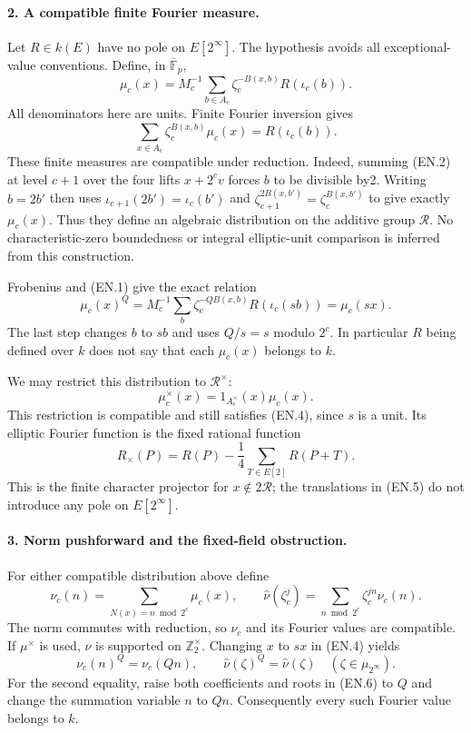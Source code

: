 \paragraph{2. A compatible finite Fourier measure.}
Let $R\in k(E)$ have no pole on $E[2^\infty]$.  The hypothesis avoids all
exceptional-value conventions.  Define, in $\overline{\mathbb F}_p$,
\[
 \mu_c(x)=M_c^{-1}\sum_{b\in A_c}
       \zeta_c^{-B(x,b)}R(\iota_c(b)).                         \tag{EN.2}
\]
All denominators here are units.  Finite Fourier inversion gives
\[
 \sum_{x\in A_c}\zeta_c^{B(x,b)}\mu_c(x)=R(\iota_c(b)).       \tag{EN.3}
\]
These finite measures are compatible under reduction.  Indeed, summing
(EN.2) at level $c+1$ over the four lifts $x+2^c v$ forces $b$ to be
divisible by2.  Writing $b=2b'$ then uses
$\iota_{c+1}(2b')=\iota_c(b')$ and
$\zeta_{c+1}^{2B(x,b')}=\zeta_c^{B(x,b')}$ to give exactly $\mu_c(x)$.
Thus they define an algebraic distribution on the additive group
$\mathcal R$.  No characteristic-zero boundedness or integral
elliptic-unit comparison is inferred from this construction.

Frobenius and (EN.1) give the exact relation
\[
 \mu_c(x)^Q
 =M_c^{-1}\sum_b\zeta_c^{-QB(x,b)}R(\iota_c(sb))
 =\mu_c(sx).                                                  \tag{EN.4}
\]
The last step changes $b$ to $sb$ and uses $Q/s=s$ modulo $2^c$.
In particular $R$ being defined over $k$ does not say that each
$\mu_c(x)$ belongs to $k$.

We may restrict this distribution to $\mathcal R^\times$:
\[
 \mu_c^\times(x)=1_{A_c^\times}(x)\mu_c(x).
\]
This restriction is compatible and still satisfies (EN.4), since $s$
is a unit.  Its elliptic Fourier function is the fixed rational function
\[
 R_\times(P)=R(P)-\frac14\sum_{T\in E[2]}R(P+T).              \tag{EN.5}
\]
This is the finite character projector for $x\notin2\mathcal R$;
the translations in (EN.5) do not introduce any pole on $E[2^\infty]$.

\paragraph{3. Norm pushforward and the fixed-field obstruction.}
For either compatible distribution above define
\[
 \nu_c(n)=\sum_{N(x)=n\bmod 2^c}\mu_c(x),\qquad
 \widehat\nu(\zeta_c^j)=\sum_{n\bmod2^c}\zeta_c^{jn}\nu_c(n).
                                                               \tag{EN.6}
\]
The norm commutes with reduction, so $\nu_c$ and its Fourier values are
compatible.  If $\mu^\times$ is used, $\nu$ is supported on
$\mathbb Z_2^\times$.  Changing $x$ to $sx$ in (EN.4) yields
\[
 \nu_c(n)^Q=\nu_c(Qn),\qquad
 \widehat\nu(\zeta)^Q=\widehat\nu(\zeta)
       \quad(\zeta\in\mu_{2^\infty}).                         \tag{EN.7}
\]
For the second equality, raise both coefficients and roots in (EN.6)
to $Q$ and change the summation variable $n$ to $Qn$.
Consequently every such Fourier value belongs to $k$.

